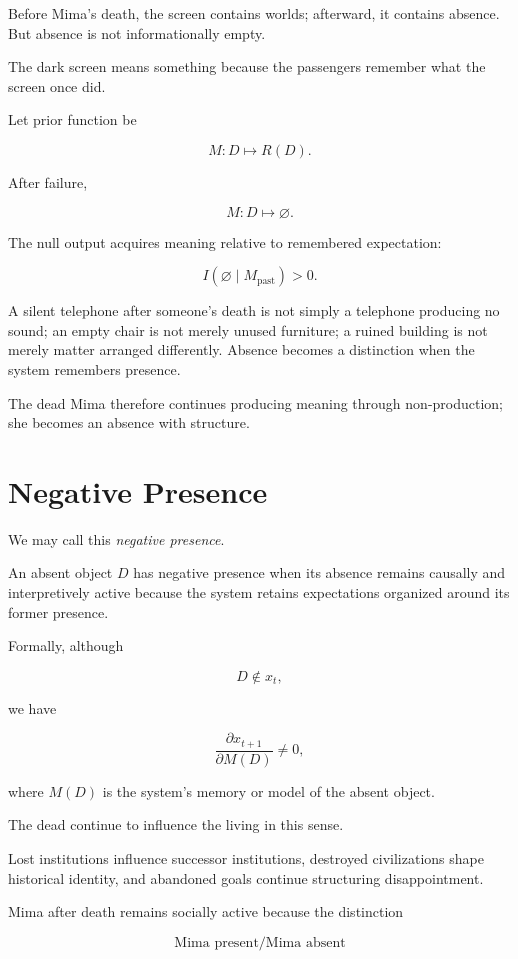 \documentclass[11pt,oneside]{book}
\theoremstyle{definition}
\theoremstyle{remark}
\begin{document}
Before Mima's death, the screen contains worlds; afterward, it contains absence. But absence is not informationally empty.

The dark screen means something because the passengers remember what the screen once did.

Let prior function be

\[
M:D\mapsto R(D).
\]

After failure,

\[
M:D\mapsto\varnothing.
\]

The null output acquires meaning relative to remembered expectation:

\[
I(\varnothing\mid M_{\mathrm{past}})>0.
\]

A silent telephone after someone's death is not simply a telephone producing no sound; an empty chair is not merely unused furniture; a ruined building is not merely matter arranged differently. Absence becomes a distinction when the system remembers presence.

The dead Mima therefore continues producing meaning through non-production; she becomes an absence with structure.

\section{Negative Presence}

We may call this \emph{negative presence}.

An absent object \(D\) has negative presence when its absence remains causally and interpretively active because the system retains expectations organized around its former presence.

Formally, although

\[
D\notin x_t,
\]

we have

\[
\frac{\partial x_{t+1}}
{\partial M(D)}
\neq0,
\]

where \(M(D)\) is the system's memory or model of the absent object.

The dead continue to influence the living in this sense.

Lost institutions influence successor institutions, destroyed civilizations shape historical identity, and abandoned goals continue structuring disappointment.

Mima after death remains socially active because the distinction

\[
\text{Mima present}/\text{Mima absent}
\]
\end{document}
